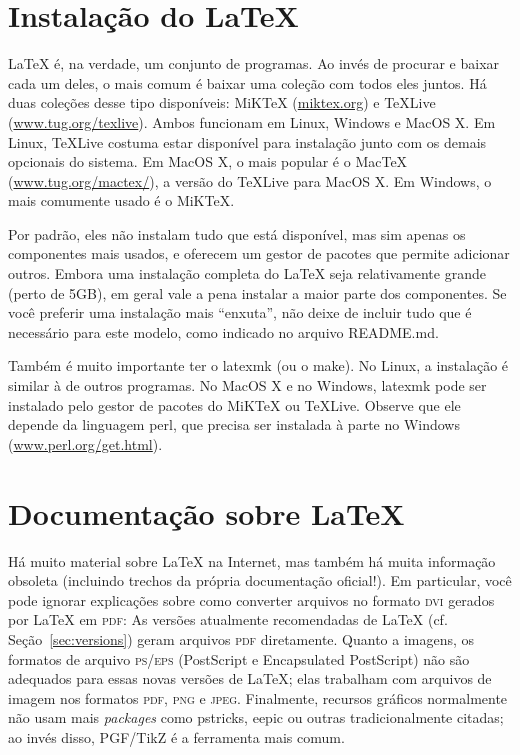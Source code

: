 \section{Instalação do \LaTeX{}}
\label{sec:install}

\LaTeX{} é, na verdade, um conjunto de programas. Ao invés de procurar e
baixar cada um deles, o mais comum é baixar uma coleção com todos eles juntos.
Há duas coleções desse tipo disponíveis: MiK\TeX{} (\url{miktex.org}) e
\TeX{}Live (\url{www.tug.org/texlive}). Ambos funcionam em Linux, Windows e
MacOS X. Em Linux, \TeX{}Live costuma estar disponível para instalação junto
com os demais opcionais do sistema. Em MacOS X, o mais popular é o Mac\TeX{}
(\url{www.tug.org/mactex/}), a versão do \TeX{}Live para MacOS X. Em Windows,
o mais comumente usado é o MiK\TeX{}.

Por padrão, eles não instalam tudo que está disponível, mas sim apenas os
componentes mais usados, e oferecem um gestor de pacotes que permite adicionar
outros. Embora uma instalação completa do \LaTeX{} seja relativamente grande
(perto de 5GB), em geral vale a pena instalar a maior parte dos componentes.
Se você preferir uma instalação mais ``enxuta'', não deixe de incluir tudo
que é necessário para este modelo, como indicado no arquivo README.md.

Também é muito importante ter o \textsf{latexmk} (ou o \textsf{make}). No
Linux, a instalação é similar à de outros programas. No MacOS X e no Windows,
\textsf{latexmk} pode ser instalado pelo gestor de pacotes do MiK\TeX{} ou
\TeX{}Live. Observe que ele depende da linguagem \textsf{perl}, que precisa
ser instalada à parte no Windows (\url{www.perl.org/get.html}).

\section{Documentação sobre \LaTeX}
\label{sec:docs}

Há muito material sobre \LaTeX{} na Internet, mas também há muita informação
obsoleta (incluindo trechos da própria documentação oficial!). Em particular,
você pode ignorar explicações sobre como converter arquivos no formato
\textsc{dvi} gerados por \LaTeX{} em \textsc{pdf}: As versões atualmente
recomendadas de \LaTeX{} (cf. Seção~\ref{sec:versions}) geram arquivos
\textsc{pdf} diretamente. Quanto a imagens, os formatos de arquivo
\textsc{ps/eps} (PostScript e Encapsulated PostScript) não são adequados
para essas novas versões de \LaTeX{}; elas trabalham com arquivos de imagem
nos formatos \textsc{pdf}, \textsc{png} e \textsc{jpeg}. Finalmente,
recursos gráficos normalmente não usam mais \textit{packages} como
\textsf{pstricks}, \textsf{eepic} ou outras tradicionalmente citadas;
ao invés disso, \textsf{PGF/TikZ} é a ferramenta mais comum.

